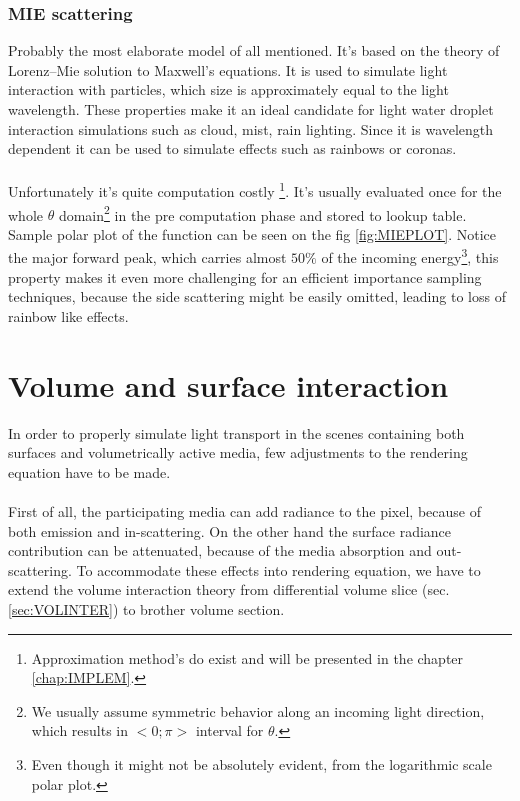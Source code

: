 \subsubsection{MIE scattering}
\label{lab:MIE}
Probably the most elaborate model of all mentioned. It's based on the theory of Lorenz–Mie solution to Maxwell's equations. It is used to simulate light interaction with particles, which size is approximately equal to the light wavelength. These properties make it an ideal candidate for light water droplet interaction simulations such as cloud, mist, rain lighting. Since it is wavelength dependent it can be used to simulate effects such as rainbows or coronas.
\\
\\
Unfortunately it's quite computation costly \footnote{Approximation method's do exist and will be presented in the chapter \ref{chap:IMPLEM}.}. It's usually evaluated once for the whole $\theta$ domain\footnote{We usually assume symmetric behavior along an incoming light direction, which results in $<0;\pi>$ interval for $\theta$.} in the pre computation phase and stored to lookup table. Sample polar plot of the function can be seen on the fig \ref{fig:MIEPLOT}. Notice the major forward peak, which carries almost $50\%$ of the incoming energy\footnote{Even though it might not be absolutely evident, from the logarithmic scale polar plot.}, this property makes it even more challenging for an efficient importance sampling techniques, because the side scattering might be easily omitted, leading to loss of rainbow like effects.


\clearpage{}
\section{Volume and surface interaction}
\label{sec:EXTREND}
In order to properly simulate light transport in the scenes containing both surfaces and volumetrically active media, few adjustments to the rendering equation have to be made.
\\
\\
First of all, the participating media can add radiance to the pixel, because of both emission and in-scattering. On the other hand the surface radiance contribution can be attenuated, because of the media absorption and out-scattering. To accommodate these effects into rendering equation, we have to extend the volume interaction theory  from differential volume slice (sec. \ref{sec:VOLINTER}) to brother volume section.

